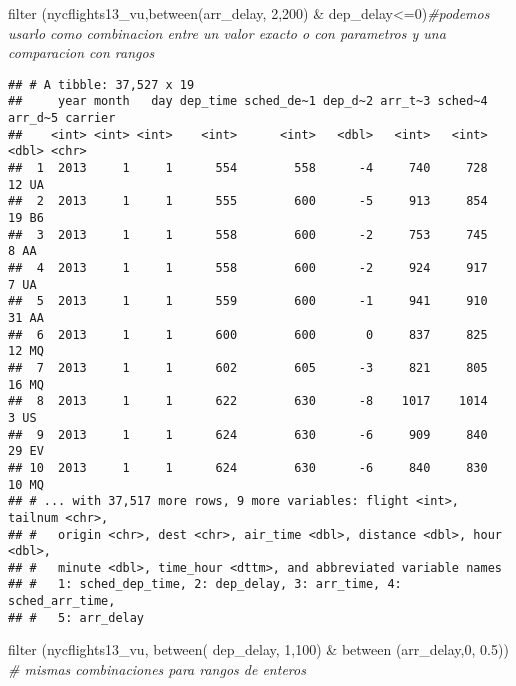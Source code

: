\documentclass[
]{article}
\newenvironment{Shaded}{\begin{snugshade}}{\end{snugshade}}
\newcommand{\CommentTok}[1]{\textcolor[rgb]{0.56,0.35,0.01}{\textit{#1}}}
\newcommand{\DecValTok}[1]{\textcolor[rgb]{0.00,0.00,0.81}{#1}}
\newcommand{\FloatTok}[1]{\textcolor[rgb]{0.00,0.00,0.81}{#1}}
\newcommand{\FunctionTok}[1]{\textcolor[rgb]{0.00,0.00,0.00}{#1}}
\newcommand{\NormalTok}[1]{#1}
\newcommand{\SpecialCharTok}[1]{\textcolor[rgb]{0.00,0.00,0.00}{#1}}
\newcommand{\StringTok}[1]{\textcolor[rgb]{0.31,0.60,0.02}{#1}}
\begin{document}
\begin{Shaded}
\begin{Highlighting}[]
\FunctionTok{filter}\NormalTok{ (nycflights13\_vu,}\FunctionTok{between}\NormalTok{(arr\_delay, }\StringTok{\textquotesingle{}2\textquotesingle{}}\NormalTok{,}\StringTok{\textquotesingle{}200\textquotesingle{}}\NormalTok{) }\SpecialCharTok{\&}\NormalTok{ dep\_delay}\SpecialCharTok{\textless{}=}\StringTok{\textquotesingle{}0\textquotesingle{}}\NormalTok{)}\CommentTok{\#podemos usarlo como combinacion entre un valor exacto o con parametros y una comparacion con rangos}
\end{Highlighting}
\end{Shaded}

\begin{verbatim}
## # A tibble: 37,527 x 19
##     year month   day dep_time sched_de~1 dep_d~2 arr_t~3 sched~4 arr_d~5 carrier
##    <int> <int> <int>    <int>      <int>   <dbl>   <int>   <int>   <dbl> <chr>  
##  1  2013     1     1      554        558      -4     740     728      12 UA     
##  2  2013     1     1      555        600      -5     913     854      19 B6     
##  3  2013     1     1      558        600      -2     753     745       8 AA     
##  4  2013     1     1      558        600      -2     924     917       7 UA     
##  5  2013     1     1      559        600      -1     941     910      31 AA     
##  6  2013     1     1      600        600       0     837     825      12 MQ     
##  7  2013     1     1      602        605      -3     821     805      16 MQ     
##  8  2013     1     1      622        630      -8    1017    1014       3 US     
##  9  2013     1     1      624        630      -6     909     840      29 EV     
## 10  2013     1     1      624        630      -6     840     830      10 MQ     
## # ... with 37,517 more rows, 9 more variables: flight <int>, tailnum <chr>,
## #   origin <chr>, dest <chr>, air_time <dbl>, distance <dbl>, hour <dbl>,
## #   minute <dbl>, time_hour <dttm>, and abbreviated variable names
## #   1: sched_dep_time, 2: dep_delay, 3: arr_time, 4: sched_arr_time,
## #   5: arr_delay
\end{verbatim}

\begin{Shaded}
\begin{Highlighting}[]
\FunctionTok{filter}\NormalTok{ (nycflights13\_vu, }\FunctionTok{between}\NormalTok{( dep\_delay, }\StringTok{\textquotesingle{}1\textquotesingle{}}\NormalTok{,}\StringTok{\textquotesingle{}100\textquotesingle{}}\NormalTok{) }\SpecialCharTok{\&} \FunctionTok{between}\NormalTok{ (arr\_delay,}\DecValTok{0}\NormalTok{, }\FloatTok{0.5}\NormalTok{)) }\CommentTok{\# mismas combinaciones para rangos de enteros}
\end{Highlighting}
\end{Shaded}
\end{document}
